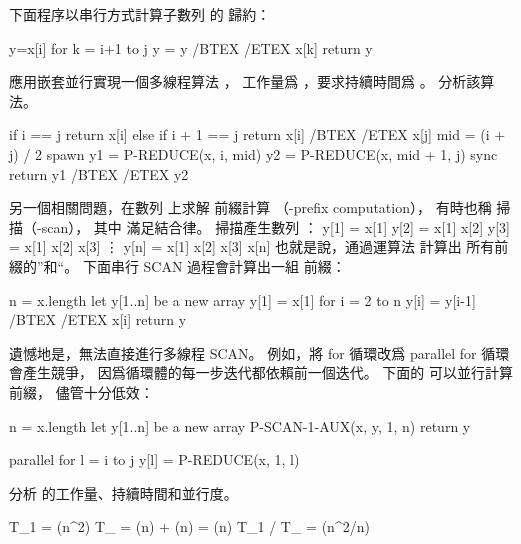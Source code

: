 下面程序以串行方式計算子數列  的 \m{\otimes} 歸約：

\startCLRS
y=x[i]
for k = i+1 to j
	y = y /BTEX \m{\otimes}/ETEX x[k]
return y
\stopCLRS

\startigBase[a]\startitem
應用嵌套並行實現一個多線程算法 ，
工作量爲 ，要求持續時間爲 。
分析該算法。
\stopitem\stopigBase

\startANSWER
{}
\startCLRS
if i == j
	return x[i]
else if i + 1 == j
	return x[i] /BTEX \m{\otimes}/ETEX x[j]
mid = (i + j) / 2
spawn y1 = P-REDUCE(x, i, mid)
y2 = P-REDUCE(x, mid + 1, j)
sync
return y1 /BTEX \m{\otimes}/ETEX y2
\stopCLRS
\stopANSWER

另一個相關問題，在數列  上求解 \m{\otimes} {\EMP 前綴計算}
（\m{\otimes}-prefix computation），
有時也稱 \m{\otimes} {\EMP 掃描}（\m{\otimes}-scan），
其中 \m{\otimes} 滿足結合律。
 \m{\otimes} 掃描產生數列 ：
\startformula\startmathalignment
\NC y[1] \NC = x[1] \NR
\NC y[2] \NC = x[1] \otimes x[2] \NR
\NC y[3] \NC = x[1] \otimes x[2] \otimes x[3] \NR
\NC      \NC \vdots \NR
\NC y[n] \NC = x[1] \otimes x[2] \otimes x[3] \otimes \cdots \otimes x[n] \NR
\stopmathalignment\stopformula
也就是說，通過運算法 \m{\otimes} 計算出  所有前綴的”和“。
下面串行 SCAN 過程會計算出一組 \m{\otimes} 前綴：

\startCLRS
n = x.length
let y[1..n] be a new array
y[1] = x[1]
for i = 2 to n
	y[i] = y[i-1] /BTEX \m{\otimes} /ETEX x[i]
return y
\stopCLRS

遺憾地是，無法直接進行多線程 SCAN。
例如，將 for 循環改爲 parallel for 循環會產生競爭，
因爲循環體的每一步迭代都依賴前一個迭代。
下面的  可以並行計算 \m{\otimes} 前綴，
儘管十分低效：

\startCLRS
n = x.length
let y[1..n] be a new array
P-SCAN-1-AUX(x, y, 1, n)
return y
\stopCLRS

\startCLRS
parallel for l = i to j
	y[l] = P-REDUCE(x, 1, l)
\stopCLRS

\startigBase[continue]\startitem
分析  的工作量、持續時間和並行度。
\stopitem\stopigBase

\startANSWER
\startformula\startmathalignment
\NC T_1 \NC = \Theta(n^2) \NR
\NC T_{\infty} \NC = \Theta(\lg n) + \Theta(\lg n) = \Theta(\lg n) \NR
\NC T_1 / T_{\infty} \NC = \Theta(n^2/\lg n) \NR
\stopmathalignment\stopformula
\stopANSWER


